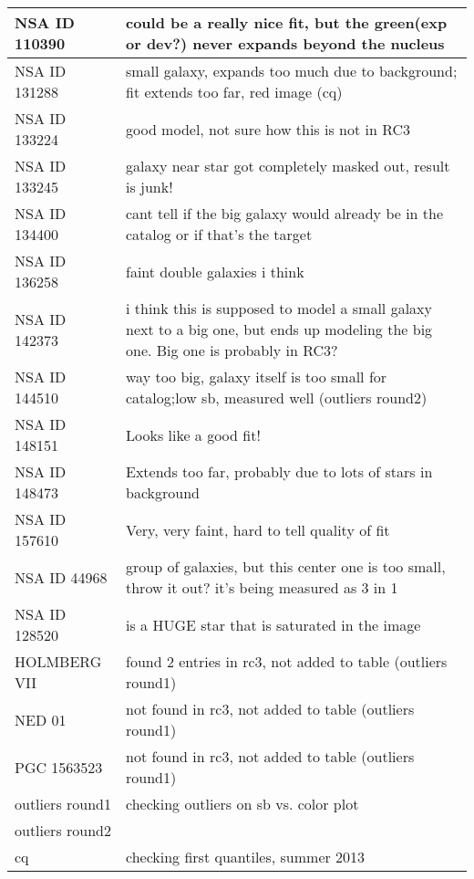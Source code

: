 \documentclass[10pt]{article}
\begin{document}
\begin{landscape}
\begin{longtable}{|l|l|}
NSA ID 110390 & could be a really nice fit, but the green(exp or dev?) never expands beyond the nucleus\\ \hline
NSA ID 131288 & small galaxy, expands too much due to background; fit extends too far, red image (cq)\\ \hline
NSA ID 133224 & good model, not sure how this is not in RC3\\ \hline
NSA ID 133245 & galaxy near star got completely masked out, result is junk!\\ \hline
NSA ID 134400 & cant tell if the big galaxy would already be in the catalog or if that's the target\\ \hline
NSA ID 136258 & faint double galaxies i think\\ \hline
NSA ID 142373 & i think this is supposed to model a small galaxy next to a big one, but ends up modeling the big one. Big one is probably in RC3?\\ \hline
NSA ID 144510 & way too big, galaxy itself is too small for catalog;low sb, measured well (outliers round2)\\ \hline
NSA ID 148151 & Looks like a good fit!\\ \hline
NSA ID 148473 & Extends too far, probably due to lots of stars in background\\ \hline
NSA ID 157610 & Very, very faint, hard to tell quality of fit\\ \hline
NSA ID 44968 & group of galaxies, but this center one is too small, throw it out? it's being measured as 3 in 1\\ \hline
NSA ID 128520 & is a HUGE star that is saturated in the image\\ \hline
HOLMBERG VII & found 2 entries in rc3, not added to table (outliers round1)\\ \hline
NED 01 & not found in rc3, not added to table (outliers round1)\\ \hline
PGC 1563523 & not found in rc3, not added to table (outliers round1)\\ \hline
outliers round1 & checking outliers on sb vs. color plot\\ \hline
outliers round2 &\\ \hline
cq & checking first quantiles, summer 2013 \\ \hline
\end{longtable}
\end{landscape}
\end{document}
